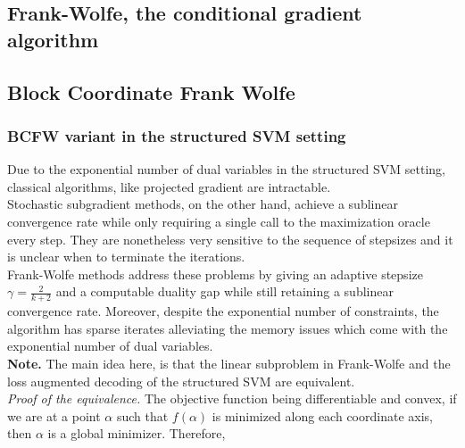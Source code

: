 \subsection{Frank-Wolfe, the conditional gradient algorithm}
\subsection{Block Coordinate Frank Wolfe}
\subsubsection{BCFW variant in the structured SVM setting}
Due to the exponential number of dual variables in the structured SVM setting,
classical algorithms, like projected gradient are intractable. \\
Stochastic subgradient methods, on the other hand, achieve a sublinear
convergence rate while only requiring a single call to the maximization oracle
every step. They are nonetheless very sensitive to the sequence of stepsizes and
it is unclear when to terminate the iterations. \\

Frank-Wolfe methods address these problems by giving an adaptive stepsize
$\gamma= \frac{2}{k+2}$ and a computable duality gap while still retaining a
sublinear convergence rate. Moreover, despite the exponential number of
constraints, the algorithm has sparse iterates alleviating the memory issues
which come with the exponential number of dual variables.\\
\textbf{Note.} The main idea here, is that the linear subproblem in Frank-Wolfe
and the loss augmented decoding of the structured SVM are equivalent. \\

\textit{Proof of the equivalence.} The objective function being differentiable
and convex, if we are at a point $\alpha$ such that $f(\alpha)$ is minimized
along each coordinate axis, then $\alpha$ is
a global minimizer. Therefore,

